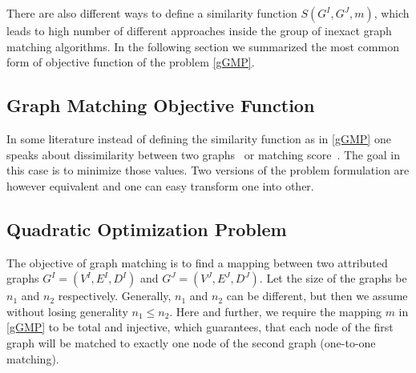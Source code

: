 There are also different ways to define a similarity function $S(G^I,G^J,m)$, which leads to high number of different approaches inside the group of inexact graph matching algorithms. In the following section we summarized the most common form of objective function of the problem \eqref{gGMP}.

\subsection{Graph Matching Objective Function}

In some literature instead of defining the similarity function as in \eqref{gGMP} one speaks about dissimilarity between two graphs~ or matching score~. The goal in this case is to minimize those values. Two versions of the problem formulation are however equivalent and one can easy transform one into other.

\subsection{Quadratic Optimization Problem}
The objective of graph matching is to find a mapping between two attributed graphs $G^I = (V^I, E^I,D^I)$ and $G^J = (V^J, E^J,D^J)$. Let the size of the graphs be $n_1$ and $n_2$ respectively. Generally, $n_1$ and $n_2$ can be different, but then we assume without losing generality $n_1\le n_2$. Here and further, we require the mapping $m$ in \eqref{gGMP} to be total and injective, which guarantees, that each node of the first graph will be matched to exactly one node of the second graph (one-to-one matching). 


